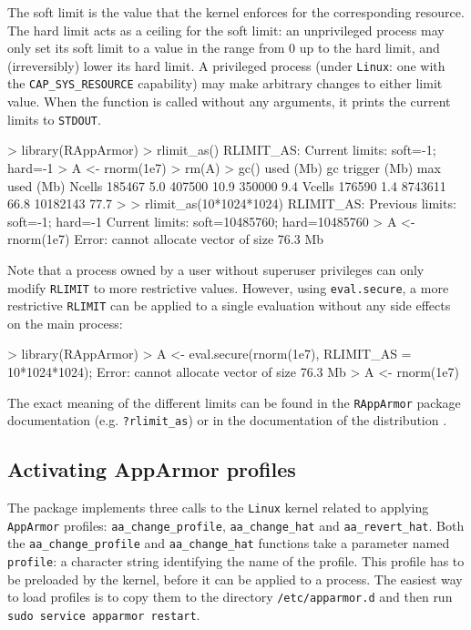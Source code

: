 \documentclass[article]{jss}
\newcommand{\AppArmor}{\texttt{AppArmor}\xspace}
\newcommand{\RAppArmor}{\pkg{RAppArmor}\xspace}
\newcommand{\Linux}{\texttt{Linux}\xspace}
\begin{document}
The soft limit is the value that the kernel enforces for the corresponding
resource. The hard limit acts as a ceiling for the soft limit: an unprivileged
process may only set its soft limit to a value in the range from 0 up to the
hard limit, and (irreversibly) lower its hard limit. A  privileged process
(under  \Linux:  one  with  the \texttt{CAP\_SYS\_RESOURCE} capability) may make
arbitrary changes to either limit value. When the function is called without any
arguments, it prints the current limits to \texttt{STDOUT}. \citep{linuxrlimit}

\begin{CodeChunk}
\begin{CodeInput}
> library(RAppArmor)
> rlimit_as()
RLIMIT_AS:
Current limits: soft=-1; hard=-1
> A <- rnorm(1e7)
> rm(A)
> gc()
         used (Mb) gc trigger (Mb) max used (Mb)
Ncells 185467  5.0     407500 10.9   350000  9.4
Vcells 176590  1.4    8743611 66.8 10182143 77.7
>
> rlimit_as(10*1024*1024)
RLIMIT_AS:
Previous limits: soft=-1; hard=-1
Current limits: soft=10485760; hard=10485760
> A <- rnorm(1e7)
Error: cannot allocate vector of size 76.3 Mb
\end{CodeInput}
\end{CodeChunk}

Note that a process owned by a user without superuser privileges can only modify
\texttt{RLIMIT} to more restrictive values. However, using \texttt{eval.secure},
a more restrictive \texttt{RLIMIT} can be applied to a single evaluation without
any side effects on the main process:

\begin{CodeChunk}
\begin{CodeInput}
> library(RAppArmor)
> A <- eval.secure(rnorm(1e7), RLIMIT_AS = 10*1024*1024);
Error: cannot allocate vector of size 76.3 Mb
> A <- rnorm(1e7)
\end{CodeInput}
\end{CodeChunk}

The exact meaning of the different limits can be found in the \texttt{RAppArmor}
package documentation (e.g. \texttt{?rlimit\_as}) or in the documentation of
the distribution \citep{ubunturlimit}.

\subsection{Activating AppArmor profiles}

The \RAppArmor package implements three calls to the \Linux kernel related
to applying \AppArmor profiles: \texttt{aa\_change\_profile},
\texttt{aa\_change\_hat} and \texttt{aa\_revert\_hat}. Both the
\texttt{aa\_change\_profile} and \texttt{aa\_change\_hat} functions take a
parameter named \texttt{profile}: a character string identifying the name of
the profile. This profile has to be preloaded by the kernel, before it can be
applied to a process. The easiest way to load profiles is to copy them to the
directory \texttt{/etc/apparmor.d} and then run \texttt{sudo service apparmor
restart}.
\end{document}
